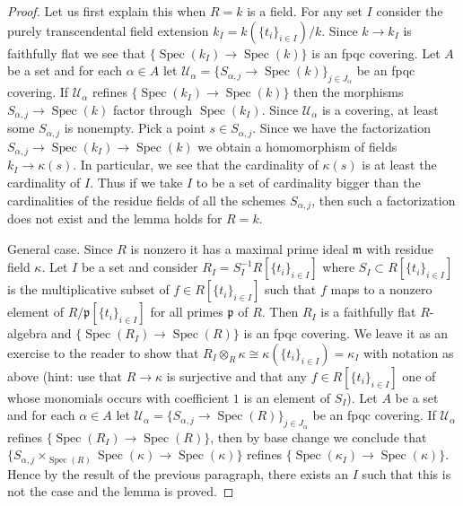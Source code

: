 \documentclass{stacks-project}
\theoremstyle{plain}
\theoremstyle{definition}
\theoremstyle{remark}
\numberwithin{equation}{subsection}
\def\Spec{\mathop{\mathrm{Spec}}}
\begin{document}
\begin{proof}
Let us first explain this when $R = k$ is a field. For any set $I$ consider
the purely transcendental field extension
$k_I = k(\{t_i\}_{i \in I})/k$. Since $k \to k_I$ is faithfully flat
we see that $\{\Spec(k_I) \to \Spec(k)\}$ is an fpqc covering.
Let $A$ be a set and for each $\alpha \in A$ let
$\mathcal{U}_\alpha = \{S_{\alpha, j} \to \Spec(k)\}_{j \in J_\alpha}$ be an
fpqc covering. If $\mathcal{U}_\alpha$ refines $\{\Spec(k_I) \to \Spec(k)\}$
then the morphisms $S_{\alpha, j} \to \Spec(k)$ factor through
$\Spec(k_I)$. Since $\mathcal{U}_\alpha$ is a covering,
at least some $S_{\alpha, j}$ is nonempty. Pick a
point $s \in S_{\alpha, j}$. Since we have the factorization
$S_{\alpha, j} \to \Spec(k_I) \to \Spec(k)$
we obtain a homomorphism of fields $k_I \to \kappa(s)$.
In particular, we see that the cardinality of $\kappa(s)$
is at least the cardinality of $I$. Thus if we take $I$ to be a set
of cardinality bigger than the cardinalities of the residue fields
of all the schemes $S_{\alpha, j}$, then such a factorization does
not exist and the lemma holds for $R = k$.

\medskip\noindent
General case. Since $R$ is nonzero it has a maximal prime ideal
$\mathfrak m$ with residue field $\kappa$. Let $I$ be a set and
consider $R_I = S_I^{-1} R[\{t_i\}_{i \in I}]$
where $S_I \subset R[\{t_i\}_{i \in I}]$ is the multiplicative
subset of $f \in R[\{t_i\}_{i \in I}]$ such that $f$ maps to
a nonzero element of $R/\mathfrak p[\{t_i\}_{i \in I}]$ for
all primes $\mathfrak p$ of $R$. Then $R_I$ is a faithfully
flat $R$-algebra and $\{\Spec(R_I) \to \Spec(R)\}$ is an
fpqc covering. We leave it as an exercise to the reader to show that
$R_I \otimes_R \kappa \cong \kappa(\{t_i\}_{i \in I}) = \kappa_I$
with notation as above (hint: use that $R \to \kappa$ is surjective
and that any $f \in R[\{t_i\}_{i \in I}]$ one of whose monomials occurs
with coefficient $1$ is an element of $S_I$). Let $A$ be a set and
for each $\alpha \in A$ let
$\mathcal{U}_\alpha = \{S_{\alpha, j} \to \Spec(R)\}_{j \in J_\alpha}$ be an
fpqc covering. If $\mathcal{U}_\alpha$ refines $\{\Spec(R_I) \to \Spec(R)\}$,
then by base change we conclude that
$\{S_{\alpha, j} \times_{\Spec(R)} \Spec(\kappa) \to \Spec(\kappa)\}$
refines $\{\Spec(\kappa_I) \to \Spec(\kappa)\}$.
Hence by the result of the previous paragraph, there exists an $I$
such that this is not the case and the lemma is proved.
\end{proof}
\end{document}
